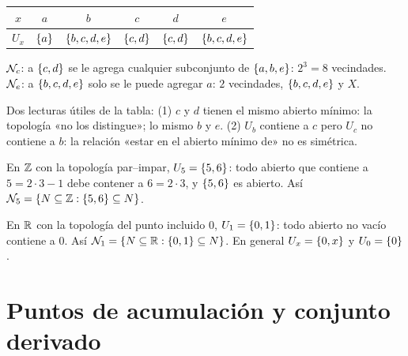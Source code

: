 \begin{ejemplo}[Ejemplo: Parte I, $\tau_1=\{X,\vac,\s{a},\s{c,d},\s{a,c,d},\s{b,c,d,e}\}$]
\begin{center}\small\renewcommand{\arraystretch}{1.15}
\begin{tabular}{@{}c|ccccc@{}}
$x$ & $a$ & $b$ & $c$ & $d$ & $e$\\ \hline
$U_x$ & $\{a\}$ & $\{b,c,d,e\}$ & $\{c,d\}$ & $\{c,d\}$ & $\{b,c,d,e\}$
\end{tabular}\end{center}
$\mathcal{N}_c$: a $\{c,d\}$ se le agrega cualquier subconjunto de $\{a,b,e\}$: $2^3=8$ vecindades. $\mathcal{N}_e$: a $\{b,c,d,e\}$
solo se le puede agregar $a$: $2$ vecindades, $\{b,c,d,e\}$ y $X$.

Dos lecturas útiles de la tabla: (1) $c$ y $d$ tienen el mismo abierto mínimo: la topología «no los distingue»; lo
mismo $b$ y $e$. (2) $U_b$ contiene a $c$ pero $U_c$ no contiene a $b$: la relación «estar en el abierto mínimo de» no
es simétrica.
\end{ejemplo}
\begin{ejemplo}
En $\mathbb{Z}$ con la topología par--impar, $U_5=\{5,6\}$: todo abierto que contiene a $5=2\cdot3-1$ debe contener a
$6=2\cdot3$, y $\{5,6\}$ es abierto. Así $\mathcal{N}_5=\{N\subseteq\mathbb{Z}:\{5,6\}\subseteq N\}$.

En $\mathbb{R}$ con la topología del punto incluido $0$, $U_1=\{0,1\}$: todo abierto no vacío contiene a $0$. Así
$\mathcal{N}_1=\{N\subseteq\mathbb{R}:\{0,1\}\subseteq N\}$. En general $U_x=\{0,x\}$ y $U_0=\{0\}$.
\end{ejemplo}

\section{Puntos de acumulación y conjunto derivado}
